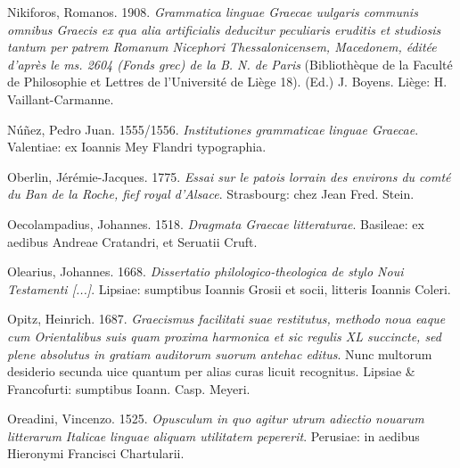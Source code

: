 \begin{styleStandard}
Nikiforos, Romanos. 1908. \textit{Grammatica linguae Graecae uulgaris communis omnibus Graecis ex qua alia artificialis deducitur peculiaris eruditis et studiosis tantum per patrem Romanum Nicephori Thessalonicensem, Macedonem, éditée d’après le ms. 2604 (Fonds grec) de la B. N. de Paris} (Bibliothèque de la Faculté de Philosophie et Lettres de l’Université de Liège 18). (Ed.) J. Boyens. Liège: H. Vaillant-Carmanne.
\end{styleStandard}

\begin{styleStandard}
Núñez, Pedro Juan. 1555/1556. \textit{Institutiones grammaticae linguae Graecae}. Valentiae: ex Ioannis Mey Flandri typographia.
\end{styleStandard}

\begin{styleStandard}
Oberlin, Jérémie-Jacques. 1775. \textit{Essai sur le patois lorrain des environs du comté du Ban de la Roche, fief royal d’Alsace}. Strasbourg: chez Jean Fred. Stein.
\end{styleStandard}

\begin{styleStandard}
Oecolampadius, Johannes. 1518. \textit{Dragmata Graecae litteraturae}. Basileae: ex aedibus Andreae Cratandri, et Seruatii Cruft.
\end{styleStandard}

\begin{styleStandard}
Olearius, Johannes. 1668. \textit{Dissertatio philologico-theologica de stylo Noui Testamenti [...]}. Lipsiae: sumptibus Ioannis Grosii et socii, litteris Ioannis Coleri.
\end{styleStandard}

\begin{styleStandard}
Opitz, Heinrich. 1687. \textit{Graecismus facilitati suae restitutus, methodo noua eaque cum Orientalibus suis quam proxima harmonica et sic regulis XL succincte, sed plene absolutus in gratiam auditorum suorum antehac editus}. Nunc multorum desiderio secunda uice quantum per alias curas licuit recognitus. Lipsiae \& Francofurti: sumptibus Ioann. Casp. Meyeri.
\end{styleStandard}

\begin{styleStandard}
Oreadini, Vincenzo. 1525. \textit{Opusculum in quo agitur utrum adiectio nouarum litterarum Italicae linguae aliquam utilitatem pepererit}. Perusiae: in aedibus Hieronymi Francisci Chartularii.
\end{styleStandard}

